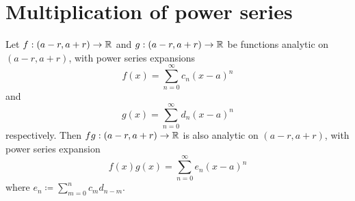 \section{Multiplication of power series}\label{ii:sec:4.4}

\begin{thm}\label{ii:4.4.1}
  Let \(f : (a - r, a + r) \to \mathbb{R}\) and \(g : (a - r, a + r) \to \mathbb{R}\) be functions analytic on \((a - r, a + r)\), with power series expansions
  \[
    f(x) = \sum_{n = 0}^\infty c_n (x - a)^n
  \]
  and
  \[
    g(x) = \sum_{n = 0}^\infty d_n (x - a)^n
  \]
  respectively.
  Then \(fg : (a - r, a + r) \to \mathbb{R}\) is also analytic on \((a - r, a + r)\), with power series expansion
  \[
    f(x) g(x) = \sum_{n = 0}^\infty e_n (x - a)^n
  \]
  where \(e_n \coloneqq \sum_{m = 0}^n c_m d_{n - m}\).
\end{thm}


